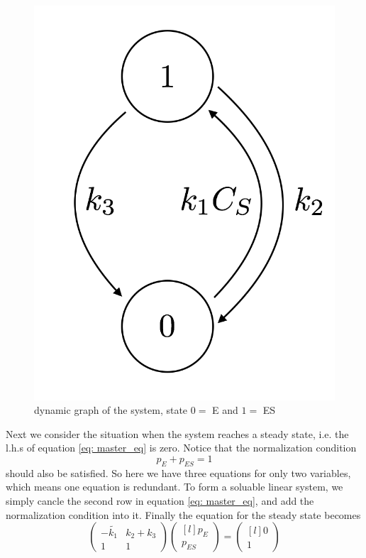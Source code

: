 	\begin{figure}
		\centering
		\includegraphics[scale=0.3]{img/dynamic_graph.png}
		\caption{dynamic graph of the system, state $0=$ E and $1=$ ES}
		\label{img:dynamics}
	\end{figure}

	Next we consider the situation when the system reaches a steady state, i.e. the l.h.s of equation \eqref{eq: master_eq} is zero. Notice that the normalization condition 
	\begin{equation}
		p_E + p_{ES} = 1
	\end{equation}
	should also be satisfied. So here we have three equations for only two variables, which means one equation is redundant. To form a soluable linear system, we simply cancle the second row in equation \eqref{eq: master_eq}, and add the normalization condition into it. Finally the equation for the steady state becomes
	\begin{equation}
		\begin{pmatrix*}
			-\widetilde{k_1} &  k_2+k_3 \\
						1	 &  1 
		\end{pmatrix*}
		\begin{pmatrix*}[l] p_E \\ p_{ES} \end{pmatrix*} = 
		\begin{pmatrix*}[l] 0 \\ 1 \end{pmatrix*}	
		\label{eq: steady_state_eq}
	\end{equation}


